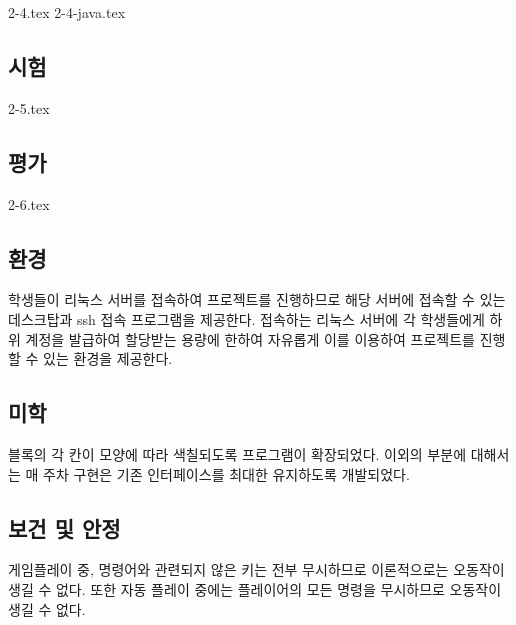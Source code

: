 {2-4.tex}
{2-4-java.tex}

\subsection{시험}
{2-5.tex}

\subsection{평가}
{2-6.tex}

\subsection{환경}
학생들이 리눅스 서버를 접속하여 프로젝트를 진행하므로 해당 서버에 접속할 수 있는 데스크탑과 ssh 접속 프로그램을 제공한다. 접속하는 리눅스 서버에 각 학생들에게 하위 계정을 발급하여 할당받는 용량에 한하여 자유롭게 이를 이용하여 프로젝트를 진행할 수 있는 환경을 제공한다.

\subsection{미학}
블록의 각 칸이 모양에 따라 색칠되도록 프로그램이 확장되었다.
이외의 부분에 대해서는 매 주차 구현은 기존 인터페이스를 최대한 유지하도록 개발되었다.

\subsection{보건 및 안정}
게임플레이 중, 명령어와 관련되지 않은 키는 전부 무시하므로 이론적으로는 오동작이 생길 수 없다.
또한 자동 플레이 중에는 플레이어의 모든 명령을 무시하므로 오동작이 생길 수 없다.

